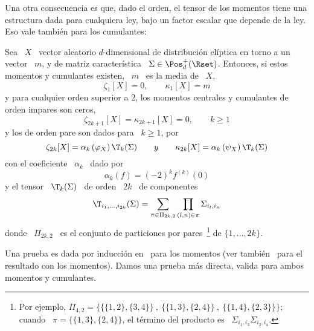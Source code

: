 Una otra consecuencia es que, dado el orden, el tensor de los momentos tiene una
estructura dada  para cualquiera ley,  bajo un factor  escalar que depende  de la
ley.  Eso vale tambi\'en para los cumulantes:
%
\begin{teorema}
\label{Teo:MP:MomentosCumulantesEliptica}
%
  Sea \ $X$  \ vector aleatorio $d$-dimensional de  distribuci\'on el\'iptica en
  torno  a  un  vector  \  $m$,  y de  matriz  caracter\'istica  \  $\Sigma  \in
  \Pos_d^+(\Rset)$.  Entonces, si  estos momentos y cumulantes existen,  \ $m$ \
  es la media de \ $X$, \ie
  \[
  \zeta_1[X] = 0, \qquad \kappa_1[X] = m
  \]
  y para cualquier orden superior a  $2$, los momentos centrales y cumulantes de
  orden impares son ceros,
  \[
  \zeta_{2 k + 1}[X] = \kappa_{2 k + 1}[X] = 0, \qquad k \ge 1
  \]
  y los de orden pare son dados para \ $k \ge 1$, por
  \[
  \zeta_{2 k}[X] = \alpha_k\left( \varphi_X \right) \T_k(\Sigma) \qquad y \qquad
  \kappa_{2 k}[X] = \alpha_k\left( \psi_X \right) \T_k(\Sigma)
  \]
  con el coeficiente \ $\alpha_k$ \ dado por
  \[
  \alpha_k(f) = (-2)^k f^{(k)}(0)
  \]
  y el tensor \ $\T_k(\Sigma)$ \ de orden \ $2 k$ \ de componentes
  \[
  \T_{i_1,\ldots,i_{2k}}(\Sigma) = \sum_{\pi \in \Pi_{2 k , 2}} \prod_{(l,n) \in
    \pi} \Sigma_{i_l,i_n}
  \]
  donde   \  $\Pi_{2   k  ,   2}$   \  es   el  conjunto   de  particiones   por
  pares~\footnote{Por  ejemplo, $\Pi_{4,2}  =  \Big\{ \big\{  \{1,2\} ,  \{3,4\}
    \big\} \:  , \: \big\{  \{1,3\} ,  \{2,4\} \big\} \:  , \: \big\{  \{1,4\} ,
    \{2,3\} \big\} \big\}$; cuando \ $\pi = \big\{ \{1,3\} , \{2,4\} \Big\}$, el
    t\'ermino del producto es \ $\Sigma_{i_1,i_3} \Sigma_{i_2,i_4}$.} de $\{ 1 ,
  \ldots , 2 k \}$.
\end{teorema}
%
Una prueba  es dada  por inducci\'on en~\cite{BerBen86}  para los  momentos (ver
tambi\'en~\cite[p.~44]{FanKot90} para el resultado  con los momentos).  Damos una
prueba m\'as directa, valida para ambos momentos y cumulantes.
%
